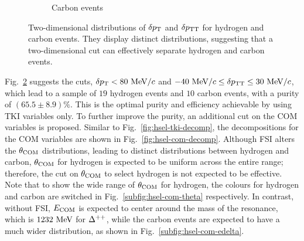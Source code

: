 \begin{figure}
\begin{subfigure}[b]{\dbfigwid\textwidth}
               \caption{Carbon events}
               \label{subfig:hsel-dpt-dptt-c}
          \end{subfigure}
          \caption{Two-dimensional distributions of $\delta p_\textrm{T}$ and $\delta p_\textrm{TT}$ for hydrogen and carbon events.
          They display distinct distributions, suggesting that a two-dimensional cut can effectively separate hydrogen and carbon events.
          }
          \label{fig:hsel-dpt-dptt}
     \end{figure}

     Fig.~\ref{fig:hsel-dpt-dptt} suggests the cuts, $\delta p_\textrm{T} < 80~\textrm{MeV}/c$ and $-40~\textrm{MeV}/c \leq \delta p_\textrm{TT} \leq 30~\textrm{MeV}/c$, which lead to a sample of $19$ hydrogen events and $10$ carbon events, with a purity of $(65.5\pm8.9)\%$.
     This is the optimal purity and efficiency achievable by using TKI variables only.
     To further improve the purity, an additional cut on the COM variables is proposed.
     Similar to Fig.~\ref{fig:hsel-tki-decomp}, the decompositions for the COM variables are shown in Fig.~\ref{fig:hsel-com-decomp}.
     Although FSI alters the $\theta_{\textrm{COM}}$ distributions, leading to distinct distributions between hydrogen and carbon, $\theta_{\textrm{COM}}$ for hydrogen is expected to be uniform across the entire range; therefore, the cut on $\theta_{\textrm{COM}}$ to select hydrogen is not expected to be effective.
     Note that to show the wide range of $\theta_{\textrm{COM}}$ for hydrogen, the colours for hydrogen and carbon are switched in Fig.~\ref{subfig:hsel-com-theta} respectively.
     In contrast, without FSI, $E_{\textrm{COM}}$ is expected to center around the mass of the resonance, which is $1232~\textrm{MeV}$ for $\Delta^{++}$, while the carbon events are expected to have a much wider distribution, as shown in Fig.~\ref{subfig:hsel-com-edelta}.
